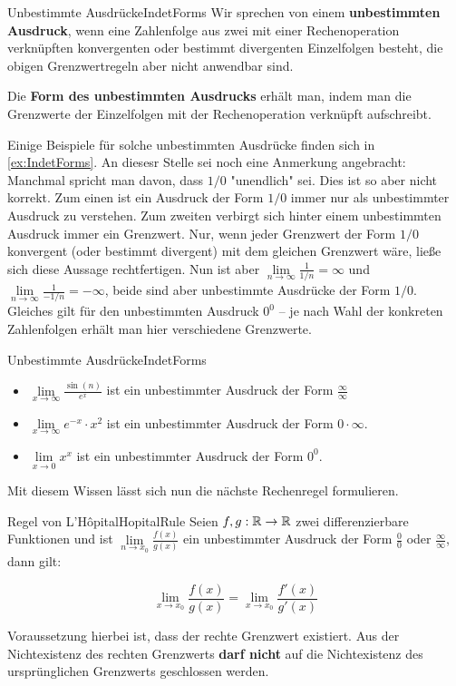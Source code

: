 \begin{definition}{Unbestimmte Ausdrücke}{IndetForms}
	Wir sprechen von einem \textbf{unbestimmten Ausdruck}, wenn eine Zahlenfolge aus zwei mit einer Rechenoperation verknüpften konvergenten oder bestimmt divergenten Einzelfolgen besteht, die obigen Grenzwertregeln aber nicht anwendbar sind.

	Die \textbf{Form des unbestimmten Ausdrucks} erhält man, indem man die Grenzwerte der Einzelfolgen mit der Rechenoperation verknüpft aufschreibt.
\end{definition}

Einige Beispiele für solche unbestimmten Ausdrücke finden sich in \ref{ex:IndetForms}. An diesesr Stelle sei noch eine Anmerkung angebracht: Manchmal spricht man davon, dass $1/0$ "unendlich" sei. Dies ist so aber nicht korrekt. Zum einen ist ein Ausdruck der Form $1/0$ immer nur als unbestimmter Ausdruck zu verstehen. Zum zweiten verbirgt sich hinter einem unbestimmten Ausdruck immer ein Grenzwert. Nur, wenn jeder Grenzwert der Form $1/0$ konvergent (oder bestimmt divergent) mit dem gleichen Grenzwert wäre, ließe sich diese Aussage rechtfertigen. Nun ist aber $\lim\limits_{n\to\infty} \frac{1}{1/n} = \infty$ und $\lim\limits_{n\to\infty} \frac{1}{-1/n} = -\infty$, beide sind aber unbestimmte Ausdrücke der Form $1/0$. Gleiches gilt für den unbestimmten Ausdruck $0^0$ -- je nach Wahl der konkreten Zahlenfolgen erhält man hier verschiedene Grenzwerte.

\begin{example}{Unbestimmte Ausdrücke}{IndetForms}
	\begin{itemize}
		\item $\lim\limits_{x\to\infty} \frac{\sin(n)}{e^x}$ ist ein unbestimmter Ausdruck der Form $\frac{\infty}{\infty}$
		\item $\lim\limits_{x\to\infty} e^{-x} \cdot x^2$ ist ein unbestimmter Ausdruck der Form $0 \cdot \infty$.
		\item $\lim\limits_{x\to 0} x^x$ ist ein unbestimmter Ausdruck der Form $0 ^ 0$.
	\end{itemize}
\end{example}

Mit diesem Wissen lässt sich nun die nächste Rechenregel formulieren.

\begin{statement}{Regel von L'Hôpital}{HopitalRule}
	Seien $f,g: \mathbb{R}\to\mathbb{R}$ zwei differenzierbare Funktionen und ist $\lim\limits_{n\to x_0} \frac{f(x)}{g(x)}$ ein unbestimmter Ausdruck der Form $\frac{0}{0}$ oder $\frac{\infty}{\infty}$, dann gilt:

    \begin{equation}
        \lim\limits_{x \to x_0} \frac{f(x)}{g(x)} = \lim\limits_{x \to x_0} \frac{f'(x)}{g'(x)}
    \end{equation}

    Voraussetzung hierbei ist, dass der rechte Grenzwert existiert. Aus der Nichtexistenz des rechten Grenzwerts \textbf{darf nicht} auf die Nichtexistenz des ursprünglichen Grenzwerts geschlossen werden.
\end{statement}


